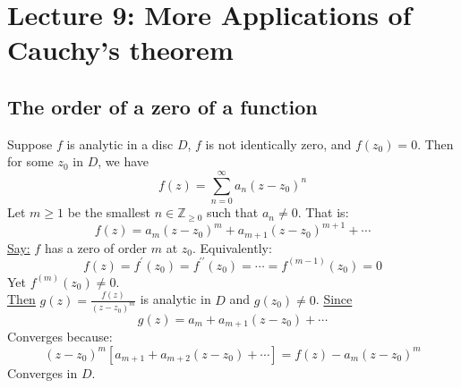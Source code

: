 \chapter{Lecture 9: More Applications of Cauchy's theorem}

\section{The order of a zero of a function}

\begin{lemma}
    Suppose $f$ is analytic in a disc $D$, $f$ is not identically zero, and $f(z_0) = 0$. Then for some $z_0$ in $D$, we have
    \begin{equation*}
        f(z) = \sum_{n=0}^{\infty} a_n(z - z_0)^n
    \end{equation*}
    Let $m \geq 1$ be the smallest $n \in \mathbb{Z}_{\geq 0}$ such that $a_n \neq 0$. That is:
    \begin{equation*}
        f(z) = a_m(z - z_0)^m + a_{m+1}(z - z_0)^{m+1} + \cdots
    \end{equation*}
    \underline{Say:} $f$ has a zero of order $m$ at $z_0$.
    Equivalently:
    \begin{equation*}
        f(z) = f^{\prime}(z_0) = f^{\prime\prime}(z_0) = \cdots = f^{(m-1)}(z_0) = 0 \label{eq:order_of_zero}
    \end{equation*}
    Yet $f^{(m)}(z_0) \neq 0$. \\
    \underline{Then} $g(z) = \frac{f(z)}{(z - z_0)^m}$ is analytic in $D$ and $g(z_0) \neq 0$.
    \underline{Since}
    \begin{equation*}
        g(z) = a_m + a_{m+1}(z - z_0) + \cdots
    \end{equation*}
    Converges because:
    \begin{equation*}
        (z - z_0)^m \left[ a_{m+1} + a_{m+2}(z - z_0) + \cdots \right] = f(z) - a_m(z - z_0)^m
    \end{equation*}
    Converges in $D$.

\end{lemma}

